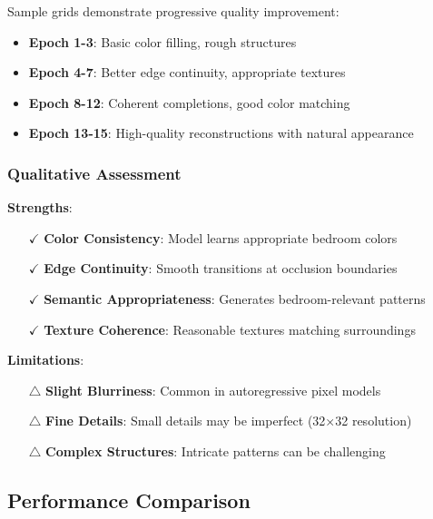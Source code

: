 \documentclass[12pt,a4paper]{article}
\begin{document}
Sample grids demonstrate progressive quality improvement:

\begin{itemize}
    \item \textbf{Epoch 1-3}: Basic color filling, rough structures
    \item \textbf{Epoch 4-7}: Better edge continuity, appropriate textures
    \item \textbf{Epoch 8-12}: Coherent completions, good color matching
    \item \textbf{Epoch 13-15}: High-quality reconstructions with natural appearance
\end{itemize}

\subsubsection{Qualitative Assessment}

\textbf{Strengths}:
\begin{itemize}
    \item[$\checkmark$] \textbf{Color Consistency}: Model learns appropriate bedroom colors
    \item[$\checkmark$] \textbf{Edge Continuity}: Smooth transitions at occlusion boundaries
    \item[$\checkmark$] \textbf{Semantic Appropriateness}: Generates bedroom-relevant patterns
    \item[$\checkmark$] \textbf{Texture Coherence}: Reasonable textures matching surroundings
\end{itemize}

\textbf{Limitations}:
\begin{itemize}
    \item[$\triangle$] \textbf{Slight Blurriness}: Common in autoregressive pixel models
    \item[$\triangle$] \textbf{Fine Details}: Small details may be imperfect (32×32 resolution)
    \item[$\triangle$] \textbf{Complex Structures}: Intricate patterns can be challenging
\end{itemize}

\subsection{Performance Comparison}
\end{document}
